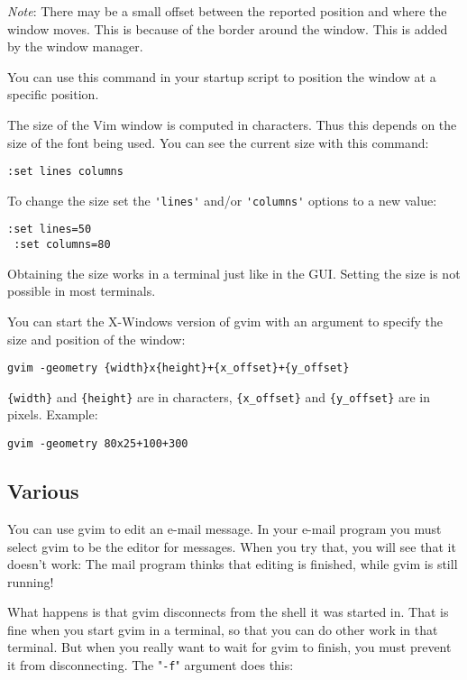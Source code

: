 \emph{Note}: There may be a small offset between the reported position and where the window moves.
This is because of the border around the window.
This is added by the window manager.

You can use this command in your startup script to position the window at a specific position.

The size of the Vim window is computed in characters.
Thus this depends on the size of the font being used.
You can see the current size with this command:

\begin{Verbatim}[samepage=true]
 :set lines columns
\end{Verbatim}

To change the size set the \verb!'lines'! and/or \verb!'columns'! options to a new value:

\begin{Verbatim}[samepage=true]
 :set lines=50
 :set columns=80
\end{Verbatim}

Obtaining the size works in a terminal just like in the GUI.
Setting the size is not possible in most terminals.

You can start the X-Windows version of gvim with an argument to specify the size and position of the window:

\begin{Verbatim}[samepage=true]
 gvim -geometry {width}x{height}+{x_offset}+{y_offset}
\end{Verbatim}

\verb!{width}! and \verb!{height}! are in characters, \verb!{x_offset}! and \verb!{y_offset}! are in pixels.
Example:

\begin{Verbatim}[samepage=true]
 gvim -geometry 80x25+100+300
\end{Verbatim}
\subsection{Various}
You can use gvim to edit an e-mail message.
In your e-mail program you must select gvim to be the editor for messages.
When you try that, you will see that it doesn't work: The mail program thinks that editing is finished, while gvim is still running!

What happens is that gvim disconnects from the shell it was started in.
That is fine when you start gvim in a terminal, so that you can do other work in that terminal.
But when you really want to wait for gvim to finish, you must prevent it from disconnecting.
The "\verb!-f!" argument does this:

